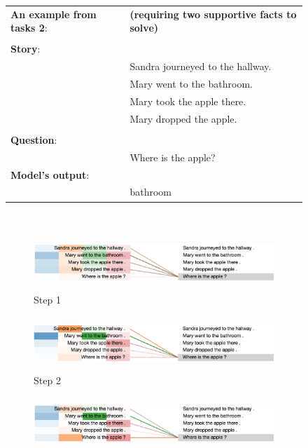 \begin{figure}[!h]
\begin{minipage}{\textwidth}
\fontsize{8}{8}\selectfont
\begin{tabular}{l l}
\textbf{An example from tasks 2}: & \textbf{(requiring two supportive facts to solve)}\\
\\
\textbf{Story}: & \\
& Sandra journeyed to the hallway. \\
& Mary went to the bathroom. \\
& Mary took the apple there. \\
& Mary dropped the apple. \\
\\
\textbf{Question}: & \\
& Where is the apple? \\
\textbf{Model's output}: & \\
& bathroom
\end{tabular}
\end{minipage}
\\  \vfill
\vspace{20pt} %
\begin{minipage}{\textwidth}
    \centering
    \begin{subfigure}[t]{\textwidth}
        \centering
        \includegraphics[height=0.8in]{04-part-03/chapter-06/figs_and_tables/figs_attention_babi/e2-step1}
        \caption{Step 1}
    \end{subfigure}%
    \hfill \hfill
    \begin{subfigure}[t]{\textwidth}
        \centering
        \includegraphics[height=0.8in]{04-part-03/chapter-06/figs_and_tables/figs_attention_babi/e2-step2}
        \caption{Step 2}
    \end{subfigure}
    \hfill \hfill
    \begin{subfigure}[t]{\textwidth}
        \centering
        \includegraphics[height=0.8in]{04-part-03/chapter-06/figs_and_tables/figs_attention_babi/e2-step3}

\end{subfigure}
\end{minipage}
\end{figure}
